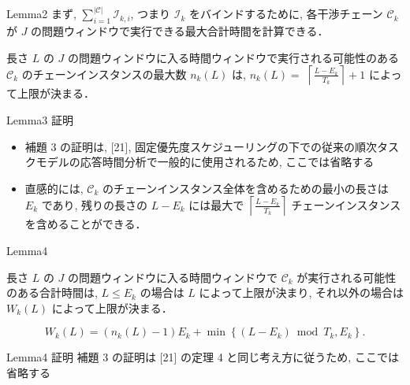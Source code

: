 \begin{frame}{Lemma2}
    まず, $\sum_{i=1}^{|\mathcal{C}|} \mathcal{I}_{k, i}$, つまり $\mathcal{I}_{k}$ をバインドするために, 各干渉チェーン $\mathcal{C}_{k}$ が $J$ の問題ウィンドウで実行できる最大合計時間を計算できる．

    \begin{lemma}[]
        長さ $L$ の $J$ の問題ウィンドウに入る時間ウィンドウで実行される可能性のある $\mathcal{C}_{k}$ のチェーンインスタンスの最大数 $n_{k}(L)$ は, $n_{k}(L)=$  $\left\lceil\frac{L-E_{k}}{T_{k}}\right\rceil+1$ によって上限が決まる．
    \end{lemma}
\end{frame}

\begin{frame}{Lemma3 証明}
    \begin{itemize}
        \item 補題 3 の証明は, [21], 固定優先度スケジューリングの下での従来の順次タスクモデルの応答時間分析で一般的に使用されるため, ここでは省略する
        \item 直感的には, $\mathcal{C}_{k}$ のチェーンインスタンス全体を含めるための最小の長さは $E_{k}$ であり, 残りの長さの $L-E_{k}$ には最大で $\left\lceil\frac{L-E_{k}}{T_{k}}\right\rceil$ チェーンインスタンスを含めることができる．
    \end{itemize}
\end{frame}

\begin{frame}{Lemma4}
    \begin{lemma}[]
        長さ $L$ の $J$ の問題ウィンドウに入る時間ウィンドウで $\mathcal{C}_{k}$ が実行される可能性のある合計時間は, $L \leq E_{k}$ の場合は $L$ によって上限が決まり, それ以外の場合は $W_{k}(L)$ によって上限が決まる．

        \begin{equation*}
            W_{k}(L)=\left(n_{k}(L)-1\right) E_{k}+\min \left\{\left(L-E_{k}\right) \bmod T_{k}, E_{k}\right\} .
        \end{equation*}
    \end{lemma}
\end{frame}

\begin{frame}{Lemma4 証明}
    補題 3 の証明は [21] の定理 4 と同じ考え方に従うため, ここでは省略する
\end{frame}

\begin{frame}{}
\end{frame}

